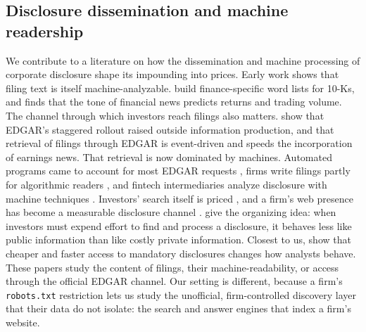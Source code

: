 \documentclass[12pt]{article}
\begin{document}
\subsection{Disclosure dissemination and machine readership}
We contribute to a literature on how the dissemination and machine processing of corporate disclosure shape its impounding into prices. Early work shows that filing text is itself machine-analyzable. \citet{LoughranMcDonald2011} build finance-specific word lists for 10-Ks, and \citet{Tetlock2007} finds that the tone of financial news predicts returns and trading volume. The channel through which investors reach filings also matters. \citet{GaoHuang2020} show that EDGAR's staggered rollout raised outside information production, and \citet{DrakeRoulstoneThornock2015} that retrieval of filings through EDGAR is event-driven and speeds the incorporation of earnings news. That retrieval is now dominated by machines. Automated programs came to account for most EDGAR requests \citep{PungaliyaWang2022}, firms write filings partly for algorithmic readers \citep{CaoJiangYangZhang2023}, and fintech intermediaries analyze disclosure with machine techniques \citep{GrennanMichaely2021}. Investors' search itself is priced \citep{DaEngelbergGao2011}, and a firm's web presence has become a measurable disclosure channel \citep{BoullandBourveauBreuer2026}. \citet{BlankespoorDehaanMarinovic2020} give the organizing idea: when investors must expend effort to find and process a disclosure, it behaves less like public information than like costly private information. Closest to us, \citet{ChangLjungqvistTseng2023} show that cheaper and faster access to mandatory disclosures changes how analysts behave. These papers study the content of filings, their machine-readability, or access through the official EDGAR channel. Our setting is different, because a firm's \texttt{robots.txt} restriction lets us study the unofficial, firm-controlled discovery layer that their data do not isolate: the search and answer engines that index a firm's website.
\end{document}
